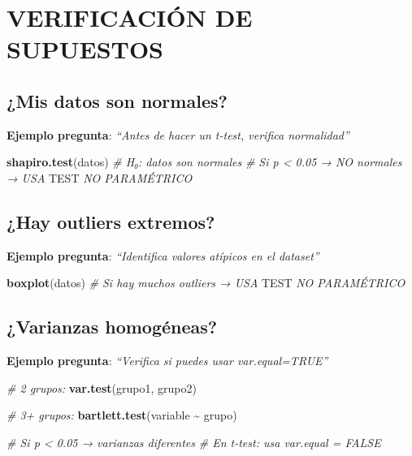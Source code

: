 \documentclass[
  10pt,
]{article}
\newenvironment{Shaded}{\begin{snugshade}}{\end{snugshade}}
\newcommand{\AlertTok}[1]{\textcolor[rgb]{0.94,0.16,0.16}{#1}}
\newcommand{\CommentTok}[1]{\textcolor[rgb]{0.56,0.35,0.01}{\textit{#1}}}
\newcommand{\FunctionTok}[1]{\textcolor[rgb]{0.13,0.29,0.53}{\textbf{#1}}}
\newcommand{\NormalTok}[1]{#1}
\newcommand{\SpecialCharTok}[1]{\textcolor[rgb]{0.81,0.36,0.00}{\textbf{#1}}}
\begin{document}
\newpage

\section{VERIFICACIÓN DE SUPUESTOS}\label{verificaciuxf3n-de-supuestos}

\subsection{¿Mis datos son normales?}\label{mis-datos-son-normales}

\textbf{Ejemplo pregunta}: \emph{``Antes de hacer un t-test, verifica
normalidad''}

\begin{Shaded}
\begin{Highlighting}[]
\FunctionTok{shapiro.test}\NormalTok{(datos)}
\CommentTok{\# H₀: datos son normales}
\CommentTok{\# Si p \textless{} 0.05 → NO normales → USA }\AlertTok{TEST}\CommentTok{ NO PARAMÉTRICO}
\end{Highlighting}
\end{Shaded}

\subsection{¿Hay outliers extremos?}\label{hay-outliers-extremos}

\textbf{Ejemplo pregunta}: \emph{``Identifica valores atípicos en el
dataset''}

\begin{Shaded}
\begin{Highlighting}[]
\FunctionTok{boxplot}\NormalTok{(datos)}
\CommentTok{\# Si hay muchos outliers → USA }\AlertTok{TEST}\CommentTok{ NO PARAMÉTRICO}
\end{Highlighting}
\end{Shaded}

\subsection{¿Varianzas homogéneas?}\label{varianzas-homoguxe9neas}

\textbf{Ejemplo pregunta}: \emph{``Verifica si puedes usar
var.equal=TRUE''}

\begin{Shaded}
\begin{Highlighting}[]
\CommentTok{\# 2 grupos:}
\FunctionTok{var.test}\NormalTok{(grupo1, grupo2)}

\CommentTok{\# 3+ grupos:}
\FunctionTok{bartlett.test}\NormalTok{(variable }\SpecialCharTok{\textasciitilde{}}\NormalTok{ grupo)}

\CommentTok{\# Si p \textless{} 0.05 → varianzas diferentes}
\CommentTok{\# En t{-}test: usa var.equal = FALSE}
\end{Highlighting}
\end{Shaded}
\end{document}
